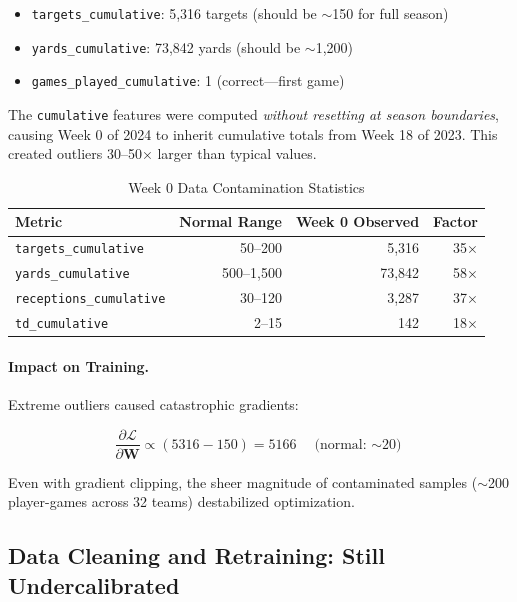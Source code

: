 \begin{itemize}
  \item \texttt{targets\_cumulative}: 5,316 targets (should be $\sim$150 for full season)
  \item \texttt{yards\_cumulative}: 73,842 yards (should be $\sim$1,200)
  \item \texttt{games\_played\_cumulative}: 1 (correct—first game)
\end{itemize}

The \texttt{cumulative} features were computed \emph{without resetting at season boundaries}, causing Week 0 of 2024 to inherit cumulative totals from Week 18 of 2023. This created outliers 30--50× larger than typical values.

\begin{table}[!ht]
\centering
\caption{Week 0 Data Contamination Statistics}
\label{tab:week0-contamination}
\begin{tabular}{@{} l r r r @{}}
\toprule
\textbf{Metric}  & \textbf{Normal Range}  & \textbf{Week 0 Observed}  & \textbf{Factor} \\
\midrule
\texttt{targets\_cumulative} & 50--200 & 5,316 & 35× \\
\texttt{yards\_cumulative} & 500--1,500 & 73,842 & 58× \\
\texttt{receptions\_cumulative} & 30--120 & 3,287 & 37× \\
\texttt{td\_cumulative} & 2--15 & 142 & 18× \\
\bottomrule
\end{tabular}
\end{table}

\paragraph{Impact on Training.}
Extreme outliers caused catastrophic gradients:

\begin{equation}
\frac{\partial \mathcal{L}}{\partial \mathbf{W}} \propto (5316 - 150) = 5166 \quad \text{(normal: $\sim$20)}
\end{equation}

Even with gradient clipping, the sheer magnitude of contaminated samples ($\sim$200 player-games across 32 teams) destabilized optimization.

\subsection{Data Cleaning and Retraining: Still Undercalibrated}

